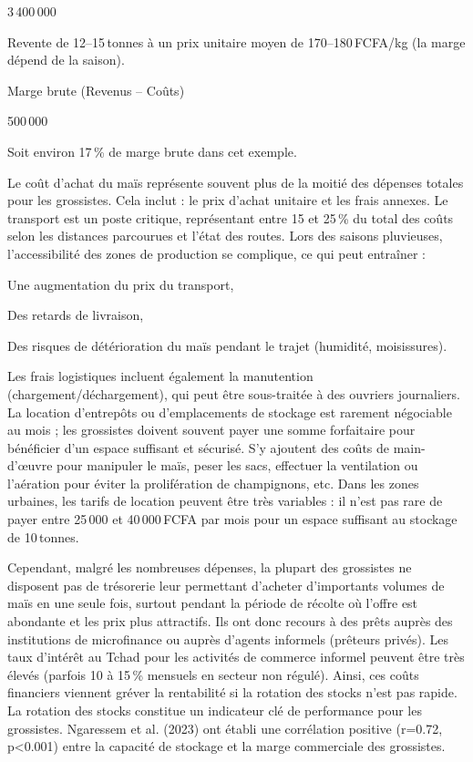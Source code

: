 \documentclass[12pt,oneside]{report}
\begin{document}
3 400 000

Revente de 12–15 tonnes à un prix unitaire moyen de 170–180 FCFA/kg (la marge dépend de la saison).

Marge brute (Revenus – Coûts)

500 000

Soit environ 17 \% de marge brute dans cet exemple.

Le coût d’achat du maïs représente souvent plus de la moitié des dépenses totales pour les grossistes. Cela inclut :  le prix d’achat unitaire et les frais annexes. Le transport est un poste critique, représentant entre 15 et 25 \% du total des coûts selon les distances parcourues et l’état des routes. Lors des saisons pluvieuses, l’accessibilité des zones de production se complique, ce qui peut entraîner :

Une augmentation du prix du transport,

Des retards de livraison,

Des risques de détérioration du maïs pendant le trajet (humidité, moisissures).

Les frais logistiques incluent également la manutention (chargement/déchargement), qui peut être sous-traitée à des ouvriers journaliers. La location d’entrepôts ou d’emplacements de stockage est rarement négociable au mois ; les grossistes doivent souvent payer une somme forfaitaire pour bénéficier d’un espace suffisant et sécurisé. S’y ajoutent des coûts de main-d’œuvre pour manipuler le maïs, peser les sacs, effectuer la ventilation ou l’aération pour éviter la prolifération de champignons, etc. Dans les zones urbaines, les tarifs de location peuvent être très variables : il n’est pas rare de payer entre 25 000 et 40 000 FCFA par mois pour un espace suffisant au stockage de 10 tonnes.

Cependant, malgré les nombreuses dépenses, la plupart des grossistes ne disposent pas de trésorerie leur permettant d’acheter d’importants volumes de maïs en une seule fois, surtout pendant la période de récolte où l’offre est abondante et les prix plus attractifs. Ils ont donc recours à des prêts auprès des institutions de microfinance ou auprès d’agents informels (prêteurs privés). Les taux d’intérêt au Tchad pour les activités de commerce informel peuvent être très élevés (parfois 10 à 15 \% mensuels en secteur non régulé). Ainsi, ces coûts financiers viennent gréver la rentabilité si la rotation des stocks n’est pas rapide. La rotation des stocks constitue un indicateur clé de performance pour les grossistes. Ngaressem et al. (2023) ont établi une corrélation positive (r=0.72, p<0.001) entre la capacité de stockage et la marge commerciale des grossistes.
\end{document}
